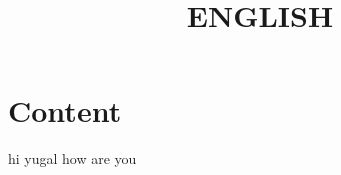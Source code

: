 \documentclass{article}
\begin{document}
    \title{ENGLISH}
    \maketitle
    \section{Content}
    hi yugal how are you
    
\end{document}
